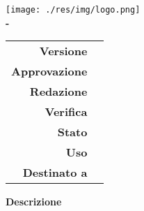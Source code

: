 \thispagestyle{empty}
\begin{titlepage}
	\begin{center}
		\texttt{[image: ./res/img/logo.png]}\\
		\large \textbf{\Gruppo\hspace{1.5mm}-\hspace{1.5mm}\NomeProgetto}
		\vfill
		\Huge \textbf{\docTitle}
		\vspace*{\fill}
        \vfill
        \large

        \begin{tabular}{r|l}
			\textbf{Versione} & \docVersion \\
			\textbf{Approvazione} & \approv \\
			\textbf{Redazione} & \red \\
			\textbf{Verifica} & \ver \\
			\textbf{Stato} & \state \\
			\textbf{Uso} & \use \\
			\textbf{Destinato a} & \destinatari\\
		\end{tabular}

		\vfill
		\normalsize
		\textbf{Descrizione}\\
		\textit{\desc} \\
		\vfill
		\small\texttt{\Mail}
	\end{center}
\end{titlepage}
